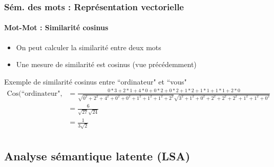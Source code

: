 \documentclass[xcolor=table]{beamer}
\begin{document}
\begin{frame}
\frametitle{Sém. des mots : Représentation vectorielle}
\framesubtitle{Mot-Mot : Similarité cosinus}

\begin{itemize}
	\item On peut calculer la similarité entre deux mots
	\item Une mesure de similarité est cosinus (vue précédemment)
\end{itemize}

\begin{exampleblock}{Exemple de similarité cosinus entre ``ordinateur" et ``vous"}
	\fontsize{6}{16}\selectfont\bfseries\boldmath
	\begin{align*}
	\text{Cos(``ordinateur", ``vous")} & = \frac{0*3+2*1+4*0+0*2+0*2+1*2+1*1+1*1+2*0}{\sqrt{0^2+2^2+4^2+0^2+0^2+1^2+1^2+1^2+2^2} \sqrt{3^2+1^2+0^2+2^2+2^2+2^2+1^2+1^2+0^2}}\\
	& = \frac{6}{\sqrt{27}\sqrt{24}}\\
	& = \frac{1}{3\sqrt{2}}\\
	\end{align*}
\end{exampleblock}



\end{frame}

\subsection{Analyse sémantique latente (LSA)}
\end{document}
